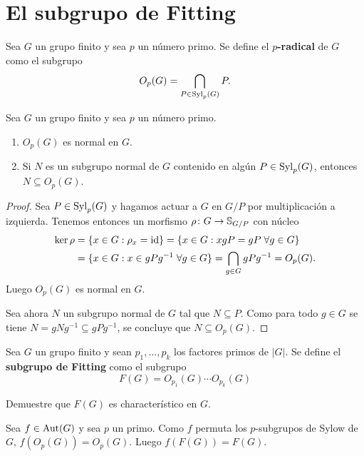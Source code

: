 \chapter{El subgrupo de Fitting}

\begin{definition}
	Sea $G$ un grupo finito y sea $p$ un número primo. Se define el
	\textbf{$p$-radical} de $G$ como el subgrupo
	\[
		O_p(G)=\bigcap_{P\in\mathrm{Syl}_p(G)}P.
	\]
\end{definition}

\begin{lemma}
	\label{lemma:core:Op(G)}
	Sea $G$ un grupo finito y sea $p$ un número primo. 
	\begin{enumerate}
		\item $O_p(G)$ es normal en $G$.
		\item Si $N$ es un subgrupo normal de $G$ contenido en algún
			$P\in\mathrm{Syl}_p(G)$, entonces $N\subseteq O_p(G)$.
	\end{enumerate}
\end{lemma}

\begin{proof}
	Sea $P\in\mathrm{Syl}_p(G)$ y hagamos actuar a $G$ en $G/P$ por multiplicación a
	izquierda. Tenemos entonces un morfismo $\rho\colon G\to\mathbb{S}_{G/P}$ con
	núcleo
	\begin{align*}
		\ker\rho&=\{x\in G:\rho_x=\operatorname{id}\}
		=\{x\in G:xgP=gP\;\forall g\in G\}\\
		&=\{x\in G:x\in gPg^{-1}\;\forall g\in G\}=\bigcap_{g\in G}gPg^{-1}=O_p(G).
	\end{align*}
	Luego $O_p(G)$ es normal en $G$.

	Sea ahora $N$ un subgrupo normal de $G$ tal que $N\subseteq P$. Como para
	todo $g\in G$ se tiene $N=gNg^{-1}\subseteq gPg^{-1}$, se concluye que
	$N\subseteq O_p(G)$.
\end{proof}

\begin{definition}
	Sea $G$ un grupo finito y sean $p_1,\dots,p_k$ los factores primos de
	$|G|$.  Se define el \textbf{subgrupo de Fitting} como el subgrupo
	\[
		F(G)=O_{p_1}(G)\cdots O_{p_k}(G)
	\]
\end{definition}

\begin{exercise}
	Demuestre que $F(G)$ es characterístico en $G$.
\end{exercise}

\begin{svgraybox}
	Sea $f\in\operatorname{Aut}(G)$ y sea $p$ un primo. Como $f$ 
	permuta los $p$-subgrupos de Sylow de $G$, $f(O_p(G))=O_p(G)$. Luego
	$f(F(G))=F(G)$.
\end{svgraybox}



